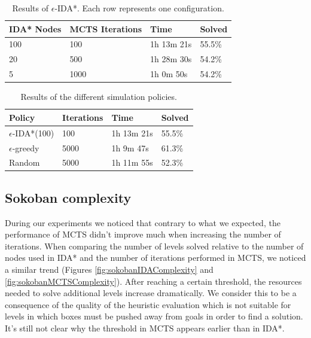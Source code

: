 \begin{table}[!h]
    \centering
    \begin{tabular}{ l | l | l | l }
        IDA* Nodes & MCTS Iterations & Time & Solved \\
        \hline
        100 & 100 & 1h 13m 21s & 55.5\% \\
        20 & 500 & 1h 28m 30s & 54.2\% \\
        5 & 1000 & 1h 0m 50s & 54.2\% \\
    \end{tabular}
    \caption[Results of $\epsilon$-IDA*]{Results of $\epsilon$-IDA*. Each row represents one configuration.}
    \label{tab:hybridpolicies}
\end{table}


\begin{table}[!h]
    \centering
    \begin{tabular}{l|l|l|l}
        Policy & Iterations & Time & Solved \\
        \hline
        $\epsilon$-IDA*(100) & 100 & 1h 13m 21s & 55.5\%\\
        $\epsilon$-greedy & 5000 & 1h 9m 47s & 61.3\% \\
        Random & 5000 & 1h 11m 55s & 52.3\% \\
    \end{tabular}
    \caption{Results of the different simulation policies.}
    \label{tab:simulationpolicies}
\end{table}

\subsection{Sokoban complexity}
During our experiments we noticed that contrary to what we expected, the performance of MCTS didn't improve much when increasing the number of iterations. When comparing the number of levels solved relative to the number of nodes used in IDA* and the number of iterations performed in MCTS, we noticed a similar trend (Figures \ref{fig:sokobanIDAComplexity} and \ref{fig:sokobanMCTSComplexity}). After reaching a certain threshold, the resources needed to solve additional levels increase dramatically. We consider this to be a consequence of the quality of the heuristic evaluation which is not suitable for levels in which boxes must be pushed away from goals in order to find a solution. It's still not clear why the threshold in MCTS appears earlier than in IDA*.

